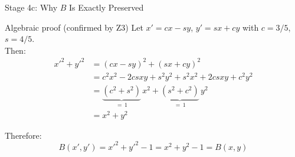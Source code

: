 \documentclass[aspectratio=169]{beamer}
\begin{document}
\begin{frame}{Stage 4c: Why $B$ Is Exactly Preserved}
\begin{block}{Algebraic proof (confirmed by Z3)}
Let $x' = cx - sy$, $y' = sx + cy$ with $c = 3/5$, $s = 4/5$.\\[6pt]
Then:
\begin{align*}
  x'^2 + y'^2 &= (cx - sy)^2 + (sx + cy)^2 \\[4pt]
  &= c^2 x^2 - 2csxy + s^2 y^2 + s^2 x^2 + 2csxy + c^2 y^2 \\[4pt]
  &= \underbrace{(c^2 + s^2)}_{=\,1}\,x^2 + \underbrace{(s^2 + c^2)}_{=\,1}\,y^2 \\[4pt]
  &= x^2 + y^2
\end{align*}
\end{block}

Therefore:
\[
  B(x', y') = x'^2 + y'^2 - 1 = x^2 + y^2 - 1 = B(x, y)
\]

\vspace{0.3em}
\begin{center}
\end{center}
\end{frame}


\end{document}
